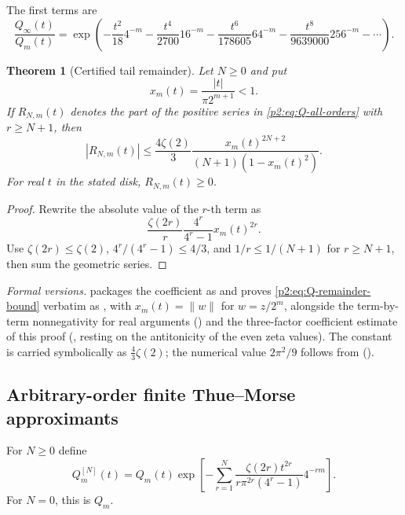 \documentclass[11pt,oneside]{article}
\numberwithin{equation}{section}
\newtheorem{theorem}{Theorem}[section]
\theoremstyle{definition}
\theoremstyle{remark}
\begin{document}
The first terms are
\begin{equation}
 \frac{Q_\infty(t)}{Q_m(t)}
 =\exp\!\left(
 -\frac{t^2}{18}4^{-m}
 -\frac{t^4}{2700}16^{-m}
 -\frac{t^6}{178605}64^{-m}
 -\frac{t^8}{9639000}256^{-m}
 -\cdots\right).
 \label{p2:eq:Q-first-terms}
\end{equation}

\begin{theorem}[Certified tail remainder]
\label{p2:thm:Q-remainder}
Let $N\ge0$ and put
\begin{equation}
 x_m(t)=\frac{|t|}{\pi2^{m+1}}<1.
 \label{p2:eq:xmt}
\end{equation}
If $R_{N,m}(t)$ denotes the part of the positive series in
\eqref{p2:eq:Q-all-orders} with $r\ge N+1$, then
\begin{equation}
 \boxed{
 |R_{N,m}(t)|
 \le \frac{4\zeta(2)}{3}
 \frac{x_m(t)^{2N+2}}{(N+1)(1-x_m(t)^2)}.}
 \label{p2:eq:Q-remainder-bound}
\end{equation}
For real $t$ in the stated disk, $R_{N,m}(t)\ge0$.
\newresult
\end{theorem}

\begin{proof}
Rewrite the absolute value of the $r$-th term as
\[
 \frac{\zeta(2r)}{r}\frac{4^r}{4^r-1}x_m(t)^{2r}.
\]
Use $\zeta(2r)\le\zeta(2)$, $4^r/(4^r-1)\le4/3$, and
$1/r\le1/(N+1)$ for $r\ge N+1$, then sum the geometric series.
\end{proof}

\emph{Formal versions.}   packages the coefficient as
 and proves \eqref{p2:eq:Q-remainder-bound} verbatim as
, with $x_m(t)=\|w\|$ for $w=z/2^m$, alongside the
term-by-term nonnegativity for real arguments () and the
three-factor coefficient estimate of this proof
(, resting on the antitonicity
 of the even zeta values).  The constant is carried symbolically
as $\tfrac43\zeta(2)$; the numerical value $2\pi^2/9$ follows from
 ().

\subsection{Arbitrary-order finite Thue--Morse approximants}

\begin{definition}
For $N\ge0$ define
\begin{equation}
 Q_m^{[N]}(t)=Q_m(t)
 \exp\!\left[-\sum_{r=1}^{N}
 \frac{\zeta(2r)t^{2r}}{r\pi^{2r}(4^r-1)}4^{-rm}\right].
 \label{p2:eq:Qcorrected}
\end{equation}
For $N=0$, this is $Q_m$.
\end{definition}
\end{document}
